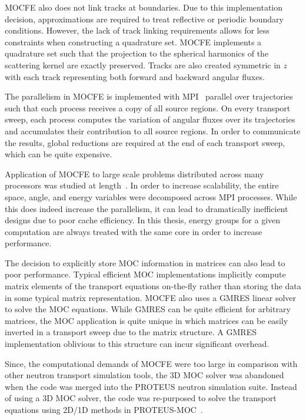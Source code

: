 MOCFE also does not link tracks at boundaries. Due to this implementation decision, approximations are required to treat reflective or periodic boundary conditions. However, the lack of track linking requirements allows for less constraints when constructing a quadrature set. MOCFE implements a quadrature set such that the projection to the spherical harmonics of the scattering kernel are exactly preserved. Tracks are also created symmetric in $z$ with each track representing both forward and backward angular fluxes.

The parallelism in MOCFE is implemented with \ac{MPI}~\cite{mpi} parallel over trajectories such that each process receives a copy of all source regions. On every transport sweep, each process computes the variation of angular fluxes over its trajectories and accumulates their contribution to all source regions. In order to communicate the results, global reductions are required at the end of each transport sweep, which can be quite expensive.

Application of MOCFE to large scale problems distributed across many processors was studied at length~\cite{mocfe_bgp}. In order to increase scalability, the entire space, angle, and energy variables were decomposed across \ac{MPI} processes. While this does indeed increase the parallelism, it can lead to dramatically inefficient designs due to poor cache efficiency. In this thesis, energy groups for a given computation are always treated with the same core in order to increase performance.

The decision to explicitly store \ac{MOC} information in matrices can also lead to poor performance. Typical efficient \ac{MOC} implementations implicitly compute matrix elements of the transport equations on-the-fly rather than storing the data in some typical matrix representation.  MOCFE also uses a \ac{GMRES} linear solver to solve the \ac{MOC} equations. While \ac{GMRES} can be quite efficient for arbitrary matrices, the  \ac{MOC} application is quite unique in which matrices can be easily inverted in a transport sweep due to the matrix structure. A \ac{GMRES} implementation oblivious to this structure can incur significant overhead.

Since, the computational demands of MOCFE were too large in comparison with other neutron transport simulation tools, the 3D \ac{MOC} solver was abandoned when the code was merged into the PROTEUS neutron simulation suite. Instead of using a 3D \ac{MOC} solver, the code was re-purposed to solve the transport equations using 2D/1D methods in PROTEUS-MOC~\cite{proteus}.

